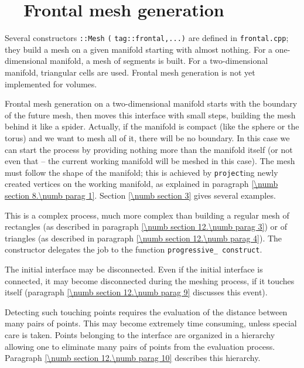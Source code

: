 \section{~~Frontal mesh generation}\label{\numb section 12.\numb parag 6}

Several constructors {\small\tt {}::Mesh} {\small\tt(}
{\small\tt\textcolor{tag}{tag}::frontal,...)} are defined in {\small\tt frontal.cpp};
they build a mesh on a given manifold starting with almost nothing.
For a one-dimensional manifold, a mesh of segments is built.
For a two-dimensional manifold, triangular cells are used.
Frontal mesh generation is not yet implemented for volumes.

Frontal mesh generation on a two-dimensional manifold starts with the boundary of
the future mesh, then moves this interface with small steps, building the mesh behind it
like a spider.
Actually, if the manifold is compact (like the sphere or the torus) and we want to mesh
all of it, there will be no boundary.
In this case we can start the process by providing nothing more than the manifold itself
(or not even that -- the current working manifold will be meshed in this case).
The mesh must follow the shape of the manifold; this is achieved by {\small\tt project}ing
newly created vertices on the working manifold, as explained in paragraph
\ref{\numb section 8.\numb parag 1}.
Section \ref{\numb section 3} gives several examples.

This is a complex process, much more complex than building a regular mesh of rectangles
(as described in paragraph \ref{\numb section 12.\numb parag 3}) or of triangles (as described
in paragraph \ref{\numb section 12.\numb parag 4}).
The constructor delegates the job to the function {\small\tt progressive\_\,construct}.

The initial interface may be disconnected.
Even if the initial interface is connected, it may become disconnected during the meshing
process, if it touches itself (paragraph \ref{\numb section 12.\numb parag 9}
discusses this event).

Detecting such touching points requires the evaluation of the distance
between many pairs of points.
This may become extremely time consuming, unless special care is taken.
Points belonging to the interface are organized in a hierarchy allowing one
to eliminate many pairs of points from the evaluation process.
Paragraph \ref{\numb section 12.\numb parag 10} describes this hierarchy.

